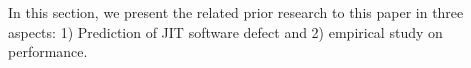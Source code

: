 In this section, we present the related prior research to this paper in three aspects: 1) Prediction of JIT software defect and 2) empirical study on performance.


